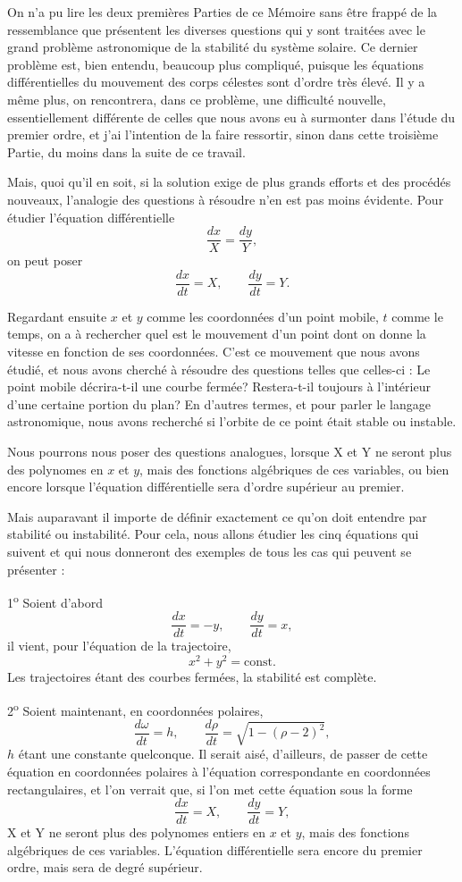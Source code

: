 \documentclass[11pt]{article}
\begin{document}
On n’a pu lire les deux premières Parties de ce Mémoire sans être frappé de la ressemblance que présentent les diverses questions qui y sont traitées avec le grand problème astronomique de la stabilité du système solaire. Ce dernier problème est, bien entendu, beaucoup plus compliqué, puisque les équations différentielles du mouvement des corps célestes sont d’ordre très élevé. Il y a même plus, on rencontrera, dans ce problème, une difficulté nouvelle, essentiellement différente de celles que nous avons eu à surmonter dans l’étude du premier ordre, et j’ai l’intention de la faire ressortir, sinon dans cette troisième Partie, du moins dans la suite de ce travail.

Mais, quoi qu’il en soit, si la solution exige de plus grands efforts et des procédés nouveaux, l’analogie des questions à résoudre n’en est pas moins évidente. Pour étudier l’équation différentielle
\[
\frac{dx}{X}=\frac{dy}{Y},
\]
on peut poser
\[
\frac{dx}{dt}=X,\qquad \frac{dy}{dt}=Y.
\]

Regardant ensuite $x$ et $y$ comme les coordonnées d’un point mobile, $t$ comme le temps, on a à rechercher quel est le mouvement d’un point dont on donne la vitesse en fonction de ses coordonnées. C’est ce mouvement que nous avons étudié, et nous avons cherché à résoudre des questions telles que celles-ci : Le point mobile décrira-t-il une courbe fermée? Restera-t-il toujours à l’intérieur d’une certaine portion du plan? En d’autres termes, et pour parler le langage astronomique, nous avons recherché si l’orbite de ce point était stable ou instable.

Nous pourrons nous poser des questions analogues, lorsque X et Y ne seront plus des polynomes en $x$ et $y$, mais des fonctions algébriques de ces variables, ou bien encore lorsque l’équation différentielle sera d’ordre supérieur au premier.

Mais auparavant il importe de définir exactement ce qu’on doit entendre par stabilité ou instabilité. Pour cela, nous allons étudier les cinq équations qui suivent et qui nous donneront des exemples de tous les cas qui peuvent se présenter :

1\textsuperscript{o} Soient d’abord
\[
\frac{dx}{dt}=-y,
\qquad
\frac{dy}{dt}=x,
\]
il vient, pour l’équation de la trajectoire,
\[
x^2+y^2=\mathrm{const.}
\]
Les trajectoires étant des courbes fermées, la stabilité est complète.

2\textsuperscript{o} Soient maintenant, en coordonnées polaires,
\[
\frac{d\omega}{dt}=h,
\qquad
\frac{d\rho}{dt}=\sqrt{1-(\rho-2)^2},
\]
$h$ étant une constante quelconque. Il serait aisé, d’ailleurs, de passer de cette équation en coordonnées polaires à l’équation correspondante en coordonnées rectangulaires, et l’on verrait que, si l’on met cette équation sous la forme
\[
\frac{dx}{dt}=X,
\qquad
\frac{dy}{dt}=Y,
\]
X et Y ne seront plus des polynomes entiers en $x$ et $y$, mais des fonctions algébriques de ces variables. L’équation différentielle sera encore du premier ordre, mais sera de degré supérieur.
\end{document}
